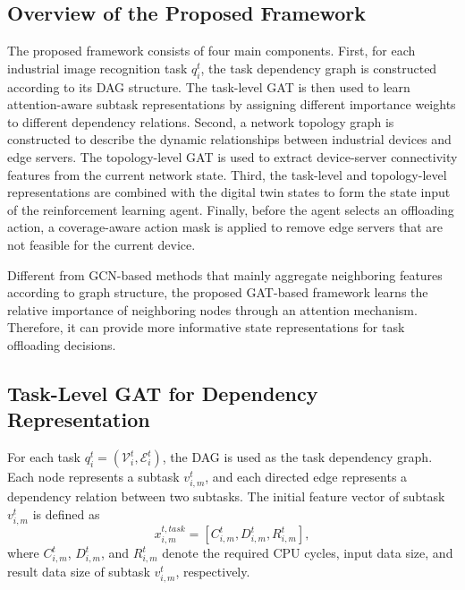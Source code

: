 \documentclass[conference]{IEEEtran}
\begin{document}
\subsection{Overview of the Proposed Framework}

The proposed framework consists of four main components. First, for each industrial image recognition task $q_i^t$, the task dependency graph is constructed according to its DAG structure. The task-level GAT is then used to learn attention-aware subtask representations by assigning different importance weights to different dependency relations. Second, a network topology graph is constructed to describe the dynamic relationships between industrial devices and edge servers. The topology-level GAT is used to extract device-server connectivity features from the current network state. Third, the task-level and topology-level representations are combined with the digital twin states to form the state input of the reinforcement learning agent. Finally, before the agent selects an offloading action, a coverage-aware action mask is applied to remove edge servers that are not feasible for the current device.

Different from GCN-based methods that mainly aggregate neighboring features according to graph structure, the proposed GAT-based framework learns the relative importance of neighboring nodes through an attention mechanism. Therefore, it can provide more informative state representations for task offloading decisions.

\subsection{Task-Level GAT for Dependency Representation}

For each task $q_i^t=(\mathcal{V}_i^t,\mathcal{E}_i^t)$, the DAG is used as the task dependency graph. Each node represents a subtask $v_{i,m}^t$, and each directed edge represents a dependency relation between two subtasks. The initial feature vector of subtask $v_{i,m}^t$ is defined as
\begin{equation}
x_{i,m}^{t,task}
=
[C_{i,m}^t,D_{i,m}^t,R_{i,m}^t],
\end{equation}
where $C_{i,m}^t$, $D_{i,m}^t$, and $R_{i,m}^t$ denote the required CPU cycles, input data size, and result data size of subtask $v_{i,m}^t$, respectively.
\end{document}
